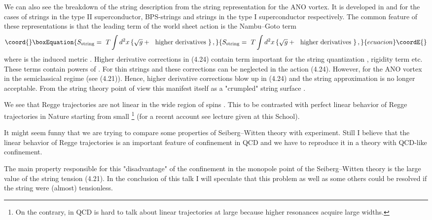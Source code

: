 \documentclass[a4paper,12pt]{article}
\def\la{\mathrel{\mathpalette\fun <}}
\def\fun#1#2{\lower3.6pt\vbox{\baselineskip0pt\lineskip.9pt
\ialign{\myHighlight{$\mathsurround=0pt#1\hfil##\hfil$}\coordHE{}\crcr#2\crcr\sim\crcr}}}
\begin{document}
We can also see the breakdown of the string description from the
string representation for the ANO vortex. It is developed in
\cite{O,BS} and \cite{Y} for the cases of strings in the type II
superconductor, BPS-strings and strings in the type I
superconductor respectively. The common feature of these
representations is that the leading term of the world sheet
action is the Nambu--Goto term
\begin{equation}\coord{}\boxEquation{
S_{\rm string}=\ T\int d^2x\left\{\sqrt g+\ \mbox{ higher
derivatives }\right\},
}{
S_{\rm string}=\ T\int d^2x\left\{\sqrt g+\ \mbox{ higher
derivatives }\right\},
}{ecuacion}\coordE{}\end{equation}
where \coordHE{} is the induced metric
\coordHE{}. Higher derivative corrections in (4.24) contain
term important for the string quantization \cite{PS,ACPZ},
rigidity term \cite{P} etc. These terms contain  powers of
\coordHE{}. For thin strings \coordHE{} and these corrections can be neglected in the action (4.24).
However, for the ANO vortex in the semiclassical regime
\coordHE{} (see
(4.21)). Hence, higher derivative corrections blow up in (4.24)
and the string approximation is no longer acceptable. From the
string theory point of view this manifest itself as a "crumpled"
string surface \cite{P,D}.

We see that Regge trajectories are not linear in the wide region
of spins \myHighlight{$j\la1/g^2$}\coordHE{}. This to be contrasted with perfect
linear behavior of Regge trajectories in Nature
starting from
small \coordHE{} \footnote{ On the contrary, in QCD is  hard to
talk about linear trajectories at large \coordHE{} because higher
resonances acquire large widths.} (for a recent account see
lecture \cite{Anis} given
at this School).

 It might seem funny that we are trying to
compare some properties of Seiberg--Witten theory with
experiment.   Still I believe that the linear behavior of Regge
trajectories is an important feature of 
confinement in QCD and we have to reproduce it in a theory
with QCD-like confinement.

The main property responsible for this "disadvantage" of the
confinement in the monopole point of the Seiberg--Witten theory
is the large value of the string tension (4.21). In the
conclusion of this talk I will speculate that this problem as
well as some others could be resolved if the string were
(almost) tensionless.
\end{document}
